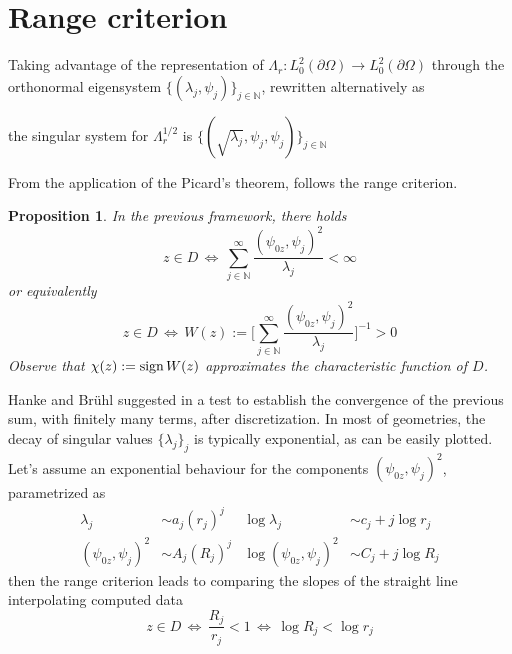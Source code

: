 \documentclass[10pt, a4paper, twoside, openright]{book}
\theoremstyle{definition}
\theoremstyle{plain}
\theoremstyle{plain}
\theoremstyle{plain}
\newtheorem{proposition}[subsection]{Proposition}
\theoremstyle{plain}
\theoremstyle{plain}
\theoremstyle{plain}
\theoremstyle{plain}
\theoremstyle{plain}
\begin{document}
\section{Range criterion}
Taking advantage of the representation of $\Lambda_r:L^2_0(\partial \Omega)\to L^2_0(\partial \Omega)$ through the orthonormal eigensystem $\bigl\{(\lambda_j, \psi_j)\bigr\}_{j\in\mathbb{N}}$, rewritten alternatively as
\begin{center}
the singular system for $\Lambda_r^{1/2}$ is $\bigl\{(\sqrt{\lambda_j}, \psi_j, \psi_j)\bigr\}_{j\in\mathbb{N}}$ 
\end{center}
From the application of the Picard's theorem, follows the range criterion.
\begin{proposition}
 In the previous framework, there holds
 \begin{equation}
  z \in D \, \Longleftrightarrow \, \sum_{j \in \mathbb{N}}^{\infty}\frac{(\psi_{0z}, \psi_j)^2}{\lambda_j} < \infty
 \end{equation}
 or equivalently
 \begin{equation}
  z \in D \, \Longleftrightarrow \, W(z):=\Bigg[\sum_{j \in \mathbb{N}}^{\infty}\frac{(\psi_{0z}, \psi_j)^2}{\lambda_j}\Bigg]^{-1} > 0
 \end{equation}
Observe that $\chi(z):=\textup{sign}\,W(z)$ approximates the characteristic function of $D$.
\end{proposition}
Hanke and Br\"{u}hl suggested in \cite{hanke-bruhl:recent} a test to establish the convergence of the previous sum, with finitely many terms, after discretization. In most of geometries, the decay of singular values $\bigl\{\lambda_j\bigr\}_j$ is typically exponential, as can be easily plotted. 
Let's assume an exponential behaviour for the components $(\psi_{0z},\psi_j )^2$, parametrized as
\begin{align}
 \lambda_j &\sim a_j (r_j) ^j  & \log\lambda_j &\sim c_j + j\log r_j\\
 (\psi_{0z}, \psi_j)^2 &\sim A_j(R_j)^j & \log(\psi_{0z}, \psi_j)^2 &\sim C_j + j\log R_j
\end{align}
then the range criterion leads to comparing the slopes of the straight line interpolating computed data
\begin{equation}
 z\in D \,\Longleftrightarrow\, \dfrac{R_j}{r_j} < 1 \,\Longleftrightarrow\, \log R_j < \log r_j
\end{equation}
\end{document}
